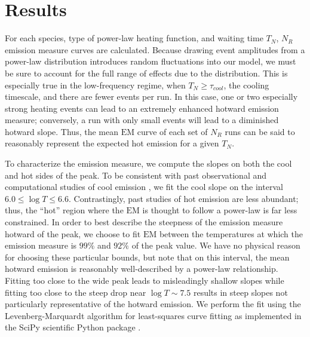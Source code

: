 \documentclass[apj]{emulateapj}
\begin{document}
	\section{Results}
	\label{sec:results}
	\par For each species, type of power-law heating function, and waiting time $T_N$, $N_{R}$ emission measure curves are calculated. Because drawing event amplitudes from a power-law distribution introduces random fluctuations into our model, we must be sure to account for the full range of effects due to the distribution. This is especially true in the low-frequency regime, when $T_N\ge\tau_{cool}$, the cooling timescale, and there are fewer events per run. In this case, one or two especially strong heating events can lead to an extremely enhanced hotward emission measure; conversely, a run with only small events will lead to a diminished hotward slope. Thus, the mean $\mathrm{EM}$ curve of each set of $N_{R}$ runs can be said to reasonably represent the expected hot emission for a given $T_N$.
	\par To characterize the emission measure, we compute the slopes on both the cool and hot sides of the peak. To be consistent with past observational and computational studies of cool emission \citep[see][and references therein]{bradshaw_diagnosing_2012}, we fit the cool slope on the interval $6.0\le\log{T}\le6.6$. Contrastingly, past studies of hot emission are less abundant; thus, the ``hot'' region where the $\mathrm{EM}$ is thought to follow a power-law is far less constrained. In order to best describe the steepness of the emission measure hotward of the peak, we choose to fit $\mathrm{EM}$ between the temperatures at which the emission measure is $99\%$ and $92\%$ of the peak value. We have no physical reason for choosing these particular bounds, but note that on this interval, the mean hotward emission is reasonably well-described by a power-law relationship. Fitting too close to the wide peak leads to misleadingly shallow slopes while fitting too close to the steep drop near $\log{T}\sim7.5$ results in steep slopes not particularly representative of the hotward emission. We perform the fit using the Levenberg-Marquardt algorithm for least-squares curve fitting as implemented in the SciPy scientific Python package \citep{van_der_walt_numpy_2011}.
\end{document}
